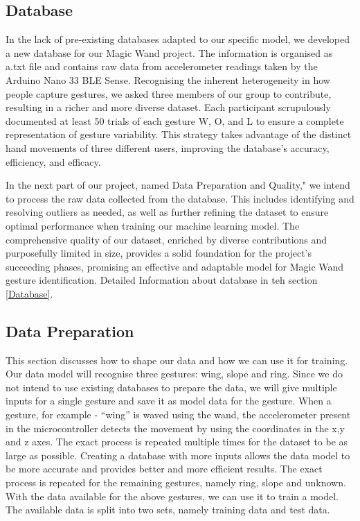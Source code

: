 \subsection{Database}

	In the lack of pre-existing databases adapted to our specific model, we developed a new database for our Magic Wand project. The information is organised as a.txt file and contains raw data from accelerometer readings taken by the Arduino Nano 33 BLE Sense. Recognising the inherent heterogeneity in how people capture gestures, we asked three members of our group to contribute, resulting in a richer and more diverse dataset. Each participant scrupulously documented at least 50 trials of each gesture W, O, and L to ensure a complete representation of gesture variability. This strategy takes advantage of the distinct hand movements of three different users, improving the database's accuracy, efficiency, and efficacy. \cite{War:2020}
	
	In the next part of our project, named Data Preparation and Quality," we intend to process the raw data collected from the database. This includes identifying and resolving outliers as needed, as well as further refining the dataset to ensure optimal performance when training our machine learning model. The comprehensive quality of our dataset, enriched by diverse contributions and purposefully limited in size, provides a solid foundation for the project's succeeding phases, promising an effective and adaptable model for Magic Wand gesture identification. Detailed Information about database in teh section \ref{Database}.
	

\subsection{Data Preparation}

	This section discusses how to shape our data and how we can use it for training. Our data model will recognise three gestures: wing, slope and ring. Since we do not intend to use existing databases to prepare the data, we will give multiple inputs for a single gesture and save it as model data for the gesture. When a gesture, for example - ``wing'' is waved using the wand, the accelerometer present in the microcontroller detects the movement by using the coordinates in the x,y and z axes. The exact process is repeated multiple times for the dataset to be as large as possible. Creating a database with more inputs allows the data model to be more accurate and provides better and more efficient results. The exact process is repeated for the remaining gestures, namely ring, slope and unknown. 
	With the data available for the above gestures, we can use it to train a model. The available data is split into two sets, namely training data and test data.

